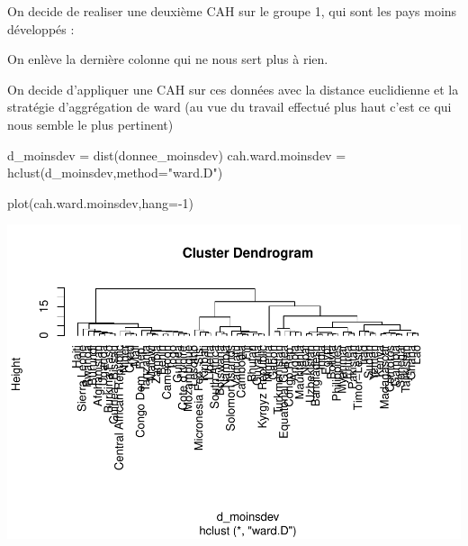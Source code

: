\documentclass[
]{article}
\newenvironment{Shaded}{}{}
\newcommand{\AttributeTok}[1]{#1}
\newcommand{\DecValTok}[1]{#1}
\newcommand{\FunctionTok}[1]{#1}
\newcommand{\NormalTok}[1]{#1}
\newcommand{\OtherTok}[1]{\textcolor[rgb]{1.00,0.25,0.00}{#1}}
\newcommand{\SpecialCharTok}[1]{\textcolor[rgb]{0.00,0.50,0.50}{#1}}
\newcommand{\StringTok}[1]{\textcolor[rgb]{0.00,0.50,0.50}{#1}}
\begin{document}
On decide de realiser une deuxième CAH sur le groupe 1, qui sont les
pays moins développés :

\begin{Shaded}
\end{Shaded}

On enlève la dernière colonne qui ne nous sert plus à rien.

On decide d'appliquer une CAH sur ces données avec la distance
euclidienne et la stratégie d'aggrégation de ward (au vue du travail
effectué plus haut c'est ce qui nous semble le plus pertinent)

\begin{Shaded}
\begin{Highlighting}[]
\NormalTok{d\_moinsdev }\OtherTok{=} \FunctionTok{dist}\NormalTok{(donnee\_moinsdev)}
\NormalTok{cah.ward.moinsdev }\OtherTok{=} \FunctionTok{hclust}\NormalTok{(d\_moinsdev,}\AttributeTok{method=}\StringTok{"ward.D"}\NormalTok{)}

\FunctionTok{plot}\NormalTok{(cah.ward.moinsdev,}\AttributeTok{hang=}\SpecialCharTok{{-}}\DecValTok{1}\NormalTok{)}
\end{Highlighting}
\end{Shaded}

\includegraphics{Projet_files/figure-latex/unnamed-chunk-31-1.pdf}
\end{document}
